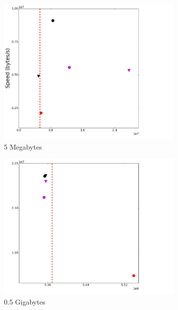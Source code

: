 \documentclass{sig-alternate-05-2015}
\begin{document}
\begin{figure}
\centering
	\begin{subfigure}{.3\linewidth}
	\includegraphics[width=\linewidth]{img/speed_bytes/5M.png}
	\caption{5 Megabytes}
	\label{speed_bytes_5M}
	\end{subfigure}
	\begin{subfigure}{.3\linewidth}
	\includegraphics[width=\linewidth]{img/speed_bytes/512M.png}
	\caption{0.5 Gigabytes}
	\label{speed_bytes_512M}
	\end{subfigure}
	\begin{subfigure}{.3\linewidth}

\end{subfigure}
\end{figure}
\end{document}
